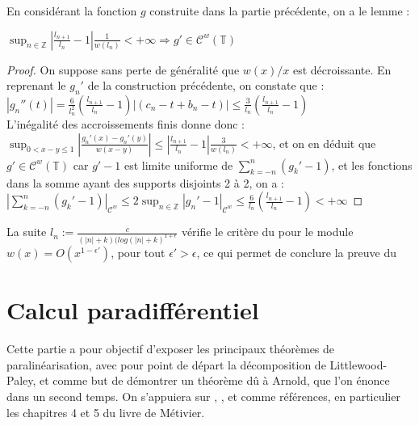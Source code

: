 \documentclass[11pt,a4paper]{article}
\begin{document}
En considérant la fonction $g$ construite dans la partie précédente, on a le lemme :

\begin{lemma}\label{reg_holder}
$ \displaystyle \sup_{n\in \mathbb{Z}} \left |\frac{l_{n+1}}{l_n}-1 \right |\frac{1}{w(l_n)} <+ \infty \Rightarrow g' \in \mathcal{C}^w(\mathbb{T})$
\end{lemma}

\begin{proof}
 On suppose sans perte de généralité que $w(x)/x$ est décroissante. En reprenant le $g_n'$ de la construction précédente, on constate que :  \\

$\displaystyle |g_n''(t)| = \frac{6}{l_n^2}(\frac{l_{n+1}}{l_n}-1)|(c_n-t + b_n -t)| \leq  \frac{3}{l_n}(\frac{l_{n+1}}{l_n}-1) $ \\

L'inégalité des accroissements finis donne donc : \\

$\displaystyle \sup_{0<x-y\leq 1} \left | \frac{g_n'(x) - g_n'(y)}{w(x-y)}\right | \leq \left | \frac{l_{n+1}}{l_n}-1\right | \frac{3}{w(l_n)} < +\infty$, et on en déduit que $g' \in \mathcal{C}^w(\mathbb{T})$ car $g'-1$ est limite uniforme de $\displaystyle  \sum_{k = -n}^n (g_k'-1)$, et les fonctions dans la somme ayant des supports disjoints 2 à 2, on a :\\

$\displaystyle  \left | \sum_{k = -n}^n (g_k'-1) \right |_{\mathcal{C}^w} \leq 2\sup_{n \in \mathbb{Z}} |g_n' -1|_{\mathcal{C}^w} \leq \frac{6}{l_n}(\frac{l_{n+1}}{l_n}-1) < + \infty $ 
\end{proof}

La suite $ \displaystyle l_n := \frac{c}{(|n|+k)(log(|n| + k)^{1+\epsilon}}$ vérifie le critère du  pour le module $w(x)=O(x^{1-\epsilon'})$, pour tout $\epsilon' > \epsilon$, ce qui permet de conclure la preuve du 

\section{Calcul paradifférentiel}
Cette partie a pour objectif d'exposer les principaux théorèmes de paralinéarisation, avec pour point de départ la décomposition de Littlewood-Paley, et comme but de démontrer un théorème dû à Arnold, que l'on énonce dans un second temps. On s'appuiera sur \cite{metivier}, \cite{dgv}, et \cite{alinhac_gerard} comme références, en particulier les chapitres 4 et 5 du livre de Métivier.
\end{document}
